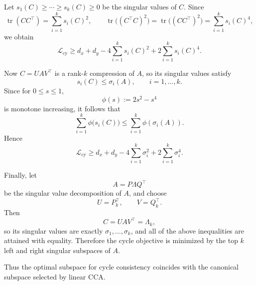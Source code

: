 \documentclass{article}
\begin{document}
Let \(s_1(C)\ge \cdots \ge s_k(C)\ge 0\) be the singular values of \(C\). Since
\[
\operatorname{tr}(C C^\top)=\sum_{i=1}^k s_i(C)^2,
\qquad
\operatorname{tr}\bigl((C^\top C)^2\bigr)
=
\operatorname{tr}\bigl((C C^\top)^2\bigr)
=
\sum_{i=1}^k s_i(C)^4,
\]
we obtain
\[
\mathcal{L}_{\mathrm{cy}}
\ge
d_x+d_y
-4\sum_{i=1}^k s_i(C)^2
+2\sum_{i=1}^k s_i(C)^4.
\]

Now \(C=UAV^\top\) is a rank-\(k\) compression of \(A\), so its singular values satisfy
\[
s_i(C)\le \sigma_i(A),
\qquad i=1,\dots,k.
\]
Since for \(0\le s\le 1\),
\[
\phi(s):=2s^2-s^4
\]
is monotone increasing, it follows that
\[
\sum_{i=1}^k \phi\bigl(s_i(C)\bigr)
\le
\sum_{i=1}^k \phi(\sigma_i(A)).
\]
Hence
\[
\mathcal{L}_{\mathrm{cy}}
\ge
d_x+d_y
-4\sum_{i=1}^k \sigma_i^2
+2\sum_{i=1}^k \sigma_i^4.
\]

Finally, let
\[
A=P\Lambda Q^\top
\]
be the singular value decomposition of \(A\), and choose
\[
U=P_k^\top,
\qquad
V=Q_k^\top.
\]
Then
\[
C = U A V^\top = \Lambda_k,
\]
so its singular values are exactly \(\sigma_1,\dots,\sigma_k\), and all of the above inequalities are attained with equality. Therefore the cycle objective is minimized by the top \(k\) left and right singular subspaces of \(A\).

Thus the optimal subspace for cycle consistency coincides with the canonical subspace selected by linear CCA.
\end{document}
